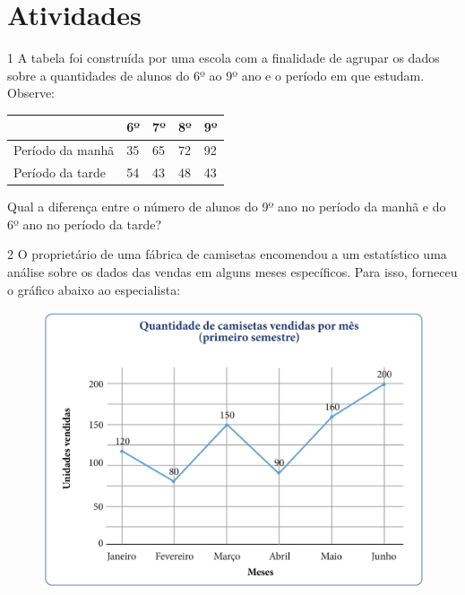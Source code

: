 \section*{Atividades}

\num{1} A tabela foi construída por uma escola com a finalidade de agrupar
os dados sobre a quantidades de alunos do 6º ao 9º ano e o período
em que estudam. Observe:

\begin{longtable}[]{@{}lllll@{}}
\toprule
& 6º & 7º & 8º & 9º\tabularnewline
\midrule
\endhead
Período da manhã & 35 & 65 & 72 & 92\tabularnewline
Período da tarde & 54 & 43 & 48 & 43\tabularnewline
\bottomrule
\end{longtable}

Qual a diferença entre o número de alunos do 9º ano no período da manhã
e do 6º ano no período da tarde?


\pagebreak
\num{2} O proprietário de uma fábrica de camisetas encomendou a um
estatístico uma análise sobre os dados das vendas em alguns
meses específicos. Para isso, forneceu o gráfico abaixo ao especialista:

\begin{figure}[htpb!]
\includegraphics[width=\textwidth]{../ilustracoes/MAT5/SAEB_5ANO_MAT_figura101.png}
\end{figure}

